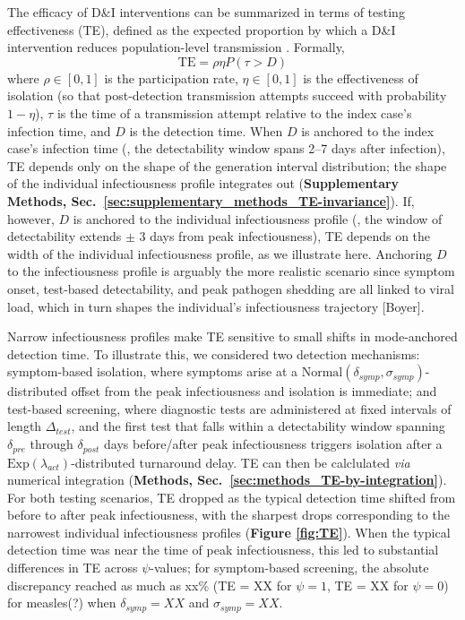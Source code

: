 The efficacy of D\&I interventions can be summarized in terms of testing effectiveness (TE), defined as the expected proportion by which a D\&I intervention reduces population-level transmission \citep{middleton_modeling_2024}. Formally, 
\begin{equation}
	\text{TE} = \rho \eta P(\tau > D)
\end{equation}
where $\rho \in [0,1]$ is the participation rate, $\eta \in [0,1]$ is the effectiveness of isolation (so that post-detection transmission attempts succeed with probability $ 1 - \eta$), $\tau$ is the time of a transmission attempt relative to the index case's infection time, and $D$ is the detection time. When $D$ is anchored to the index case's infection time (\eg, the detectability window spans 2--7 days after infection), TE depends only on the shape of the generation interval distribution; the shape of the individual infectiousness profile integrates out ({\bf Supplementary Methods, Sec.~\ref{sec:supplementary_methods_TE-invariance}}). If, however, $D$ is anchored to the individual infectiousness profile (\eg, the window of detectability extends $\pm$ 3 days from peak infectiousness), TE depends on the width of the individual infectiousness profile, as we illustrate here. Anchoring $D$ to the infectiousness profile is arguably the more realistic scenario since symptom onset, test-based detectability, and peak pathogen shedding are all linked to viral load, which in turn shapes the individual's infectiousness trajectory [Boyer]. 

Narrow infectiousness profiles make TE sensitive to small shifts in mode-anchored detection time. To illustrate this, we considered two detection mechanisms: symptom-based isolation, where symptoms arise at a $\text{Normal}(\delta_{symp}, \sigma_{symp})$-distributed offset from the peak infectiousness and isolation is immediate; and test-based screening, where diagnostic tests are administered at fixed intervals of length $\Delta_{test}$, and the first test that falls within a detectability window spanning $\delta_{pre}$ through $\delta_{post}$ days before/after peak infectiousness triggers isolation after a $\text{Exp}(\lambda_{act})$-distributed turnaround delay. TE can then be calclulated {\it via} numerical integration ({\bf Methods, Sec.~\ref{sec:methods_TE-by-integration}}). For both testing scenarios, TE dropped as the typical detection time shifted from before to after peak infectiousness, with the sharpest drops corresponding to the narrowest individual infectiousness profiles ({\bf Figure \ref{fig:TE}}). When the typical detection time was near the time of peak infectiousness, this led to substantial differences in TE across $\psi$-values; for symptom-based screening, the absolute discrepancy reached as much as xx\% (TE = XX for $\psi = 1$, TE = XX for $\psi = 0$) for measles(?) when $\delta_{symp} = XX$ and $\sigma_{symp} = XX$. 

